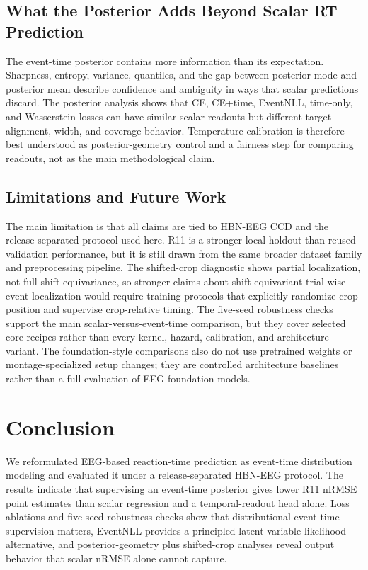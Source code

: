 \documentclass[12pt]{article}
\begin{document}
\subsection{What the Posterior Adds Beyond Scalar RT Prediction}

The event-time posterior contains more information than its expectation. Sharpness, entropy, variance, quantiles, and the gap between posterior mode and posterior mean describe confidence and ambiguity in ways that scalar predictions discard. The posterior analysis shows that CE, CE+time, EventNLL, time-only, and Wasserstein losses can have similar scalar readouts but different target-alignment, width, and coverage behavior. Temperature calibration is therefore best understood as posterior-geometry control and a fairness step for comparing readouts, not as the main methodological claim.

\subsection{Limitations and Future Work}

The main limitation is that all claims are tied to HBN-EEG CCD and the release-separated protocol used here. R11 is a stronger local holdout than reused validation performance, but it is still drawn from the same broader dataset family and preprocessing pipeline. The shifted-crop diagnostic shows partial localization, not full shift equivariance, so stronger claims about shift-equivariant trial-wise event localization would require training protocols that explicitly randomize crop position and supervise crop-relative timing. The five-seed robustness checks support the main scalar-versus-event-time comparison, but they cover selected core recipes rather than every kernel, hazard, calibration, and architecture variant. The foundation-style comparisons also do not use pretrained weights or montage-specialized setup changes; they are controlled architecture baselines rather than a full evaluation of EEG foundation models.

\section{Conclusion}

We reformulated EEG-based reaction-time prediction as event-time distribution modeling and evaluated it under a release-separated HBN-EEG protocol. The results indicate that supervising an event-time posterior gives lower R11 nRMSE point estimates than scalar regression and a temporal-readout head alone. Loss ablations and five-seed robustness checks show that distributional event-time supervision matters, EventNLL provides a principled latent-variable likelihood alternative, and posterior-geometry plus shifted-crop analyses reveal output behavior that scalar nRMSE alone cannot capture.
\end{document}
